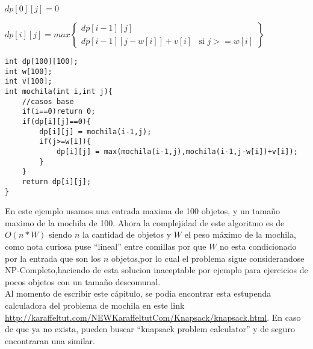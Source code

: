 $dp[0][j] = 0$

$dp[i][j]= max \left\{\begin{array}{lr} dp[i-1][j]\\dp[i-1][j-w[i]]+v[i] & \text{si } j>=w[i] \end{array}\right\}$

\begin{minipage}{\textwidth}
\begin{lstlisting}[style=C,caption=mochila.cpp]
int dp[100][100];
int w[100];
int v[100];
int mochila(int i,int j){
    //casos base
    if(i==0)return 0;
    if(dp[i][j]==0){
        dp[i][j] = mochila(i-1,j);
        if(j>=w[i]){
            dp[i][j] = max(mochila(i-1,j),mochila(i-1,j-w[i])+v[i]);
        }
    }
    return dp[i][j];
}
\end{lstlisting}
\end{minipage}

En este ejemplo usamos una entrada maxima de 100 objetos, y un tamaño maximo de la mochila de 100. Ahora la complejidad de este algoritmo es de $O(n*W)$ siendo $n$ la cantidad de objetos y $W$ el peso máximo de la mochila, como nota curiosa puse ``lineal'' entre comillas por que $W$ no esta condicionado por la entrada que son los $n$ objetos,por lo cual el problema sigue considerandose NP-Completo,haciendo de esta solucion inaceptable por ejemplo para ejercicios de pocos objetos con un tamaño descomunal.
\\Al momento de escribir este cápitulo, se podia encontrar esta estupenda calculadora del problema de mochila en este link \url{http://karaffeltut.com/NEWKaraffeltutCom/Knapsack/knapsack.html}. En caso de que ya no exista, pueden buscar ``knapsack problem calculator'' y de seguro encontraran una similar.